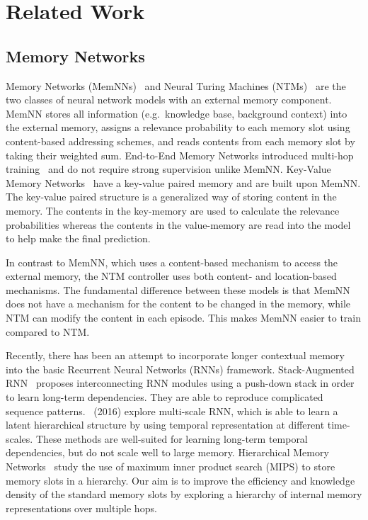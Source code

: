 \section{Related Work}
    \subsection{Memory Networks}
    Memory Networks (MemNNs)~\cite{DBLP:journals/corr/WestonCB14} and Neural Turing Machines (NTMs)~\cite{graves2014neural} are the two classes of neural network models with an external memory component. MemNN stores all information (e.g.\ knowledge base, background context) into the external memory, assigns a relevance probability to each memory slot using content-based addressing schemes, and reads contents from each memory slot by taking their weighted sum. End-to-End Memory Networks introduced multi-hop training~\cite{NIPS2015_end_to_end} and do not require strong supervision unlike MemNN\@. Key-Value Memory Networks~\cite{DBLP:journals/corr/MillerFDKBW16} have a key-value paired memory and are built upon MemNN\@. The key-value paired structure is a generalized way of storing content in the memory. The contents in the key-memory are used to calculate the relevance probabilities whereas the contents in the value-memory are read into the model to help make the final prediction.
    
    In contrast to MemNN, which uses a content-based mechanism to access the external memory, the NTM controller uses both content- and location-based mechanisms. The fundamental difference between these models is that MemNN does not have a mechanism for the content to be changed in the memory, while NTM can modify the content in each episode. This makes MemNN easier to train compared to NTM. 
    
    
    Recently, there has been an attempt to incorporate longer contextual memory into the basic Recurrent Neural Networks (RNNs) framework. Stack-Augmented RNN~\cite{joulin2015inferring} proposes interconnecting RNN modules using a push-down stack in order to learn long-term dependencies. They are able to reproduce complicated sequence patterns.~\citeauthor{chung2016hierarchical} (2016) explore multi-scale RNN, which is able to learn a latent hierarchical structure by using temporal representation at different time-scales. These methods are well-suited for learning long-term temporal dependencies, but do not scale well to large memory. Hierarchical Memory Networks~\cite{chandar2016hierarchical} study the use of maximum inner product search (MIPS) to store memory slots in a hierarchy. Our aim is to improve the efficiency and knowledge density of the standard memory slots by exploring a hierarchy of internal memory representations over multiple hops.
    
